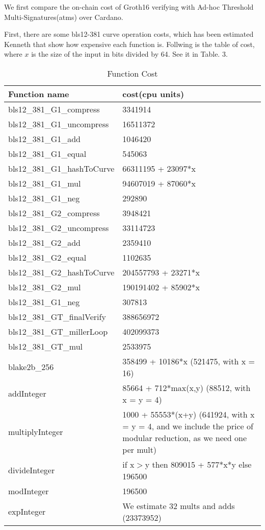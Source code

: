 \documentclass{article}
\begin{document}
We first compare the on-chain cost of Groth16 verifying with Ad-hoc Threshold Multi-Signatures(atms) over Cardano.

First, there are some bls12-381 curve operation costs, which has been estimated Kenneth that show how expensive each function is. Follwing is the table of cost, where $x$ is the size of the input in bits divided by 64. See it in Table. 3.


\begin{table}[H]
    \centering
    \begin{tabular}{p{5cm}|p{7cm}} \hline
         Function name & cost(cpu units)  \\ \hline
         bls12\_381\_G1\_compress&   3341914 \\ \hline
         bls12\_381\_G1\_uncompress&   16511372 \\ \hline
         bls12\_381\_G1\_add&   1046420 \\ \hline
         bls12\_381\_G1\_equal&   545063 \\ \hline
         bls12\_381\_G1\_hashToCurve&   66311195 + 23097*x  \\ \hline
         bls12\_381\_G1\_mul         &94607019 + 87060*x \\ \hline
         bls12\_381\_G1\_neg         &292890 \\ \hline
         bls12\_381\_G2\_compress&   3948421 \\ \hline
         bls12\_381\_G2\_uncompress&   33114723 \\ \hline
         bls12\_381\_G2\_add&   2359410 \\ \hline
         bls12\_381\_G2\_equal&   1102635 \\ \hline
         bls12\_381\_G2\_hashToCurve&   204557793 + 23271*x  \\ \hline
         bls12\_381\_G2\_mul         &190191402 + 85902*x \\ \hline
         bls12\_381\_G1\_neg         &307813 \\ \hline
         bls12\_381\_GT\_finalVerify & 388656972 \\ \hline
         bls12\_381\_GT\_millerLoop  & 402099373 \\ \hline
         bls12\_381\_GT\_mul         & 2533975   \\ \hline
         blake2b\_256                & 358499 + 10186*x (521475, with x = 16) \\ \hline
         addInteger                  &85664 + 712*max(x,y) (88512, with x = y = 4) \\ \hline
         multiplyInteger             &1000 + 55553*(x+y) (641924, with x = y = 4, and we include the price of modular reduction, as we need one per mult)  \\ \hline
         divideInteger            &if x$>$y then  809015 + 577*x*y else  196500 \\ \hline
         modInteger                      & 196500 \\ \hline
         expInteger                      & We estimate 32 mults and adds (23373952) \\ \hline
    \end{tabular}
    \caption{Function Cost}
    \label{tab:my_label}
\end{table}
\end{document}
